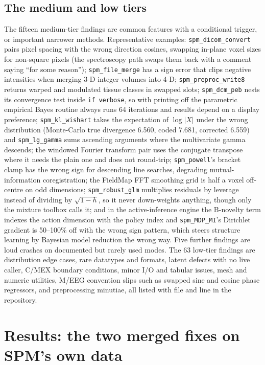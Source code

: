 \documentclass[11pt]{article}
\newcommand{\code}[1]{\texttt{#1}}
\begin{document}
\subsection{The medium and low tiers}
The fifteen medium-tier findings are common features with a conditional trigger, or important narrower methods. Representative examples: \code{spm\_dicom\_convert} pairs pixel spacing with the wrong direction cosines, swapping in-plane voxel sizes for non-square pixels (the spectroscopy path swaps them back with a comment saying ``for some reason''); \code{spm\_file\_merge} has a sign error that clips negative intensities when merging 3-D integer volumes into 4-D; \code{spm\_preproc\_write8} returns warped and modulated tissue classes in swapped slots; \code{spm\_dcm\_peb} nests its convergence test inside \code{if verbose}, so with printing off the parametric empirical Bayes routine \cite{friston2016} always runs 64 iterations and results depend on a display preference; \code{spm\_kl\_wishart} takes the expectation of $\log|X|$ under the wrong distribution (Monte-Carlo true divergence 6.560, coded 7.681, corrected 6.559) and \code{spm\_lg\_gamma} sums ascending arguments where the multivariate gamma descends; the windowed Fourier transform pair uses the conjugate transpose where it needs the plain one and does not round-trip; \code{spm\_powell}'s bracket clamp has the wrong sign for descending line searches, degrading mutual-information coregistration; the FieldMap FFT smoothing grid is half a voxel off-centre on odd dimensions; \code{spm\_robust\_glm} multiplies residuals by leverage instead of dividing by $\sqrt{1-h}$, so it never down-weights anything, though only the mixture toolbox calls it; and in the active-inference engine \cite{friston2017} the B-novelty term indexes the action dimension with the policy index and \code{spm\_MDP\_MI}'s Dirichlet gradient is 50--100\% off with the wrong sign pattern, which steers structure learning by Bayesian model reduction \cite{smith2020} the wrong way. Five further findings are loud crashes on documented but rarely used modes. The 63 low-tier findings are distribution edge cases, rare datatypes and formats, latent defects with no live caller, C/MEX boundary conditions, minor I/O and tabular issues, mesh and numeric utilities, M/EEG convention slips such as swapped sine and cosine phase regressors, and preprocessing minutiae, all listed with file and line in the repository.

\section{Results: the two merged fixes on SPM's own data}
\label{sec:realdata}
\end{document}
